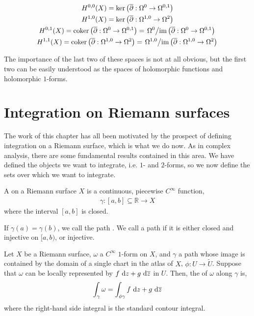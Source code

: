 \begin{gather*}
	H ^{0,0}(X) = \ker \left( \overline{\partial}: \Omega^0 \to \Omega ^{0,1} \right)\\
	H ^{1,0}(X) = \ker \left( \overline{\partial}: \Omega ^{1,0} \to \Omega^2 \right)\\
	H ^{0,1}(X) = \operatorname{coker} \left( \overline{\partial}: \Omega^0 \to \Omega ^{0,1}
	\right) = \left. \Omega^{0}\middle/\operatorname{im} \left( \overline{\partial
	}:\Omega^{0}\to \Omega^{0,1} \right) \right.\\
	H ^{1,1}(X) = \operatorname{coker} \left( \overline{\partial}: \Omega ^{1,0} \to \Omega^2
	\right) = \left. \Omega^{1,0}\middle/\operatorname{im} \left( \overline{\partial }:
	\Omega^{1,0}\to \Omega^{2} \right) \right.
\end{gather*}

The importance of the last two of these spaces is not at all obvious, but the
first two can be easily understood as the spaces of holomorphic functions and
holomorphic $ 1 $-forms.

\section{Integration on Riemann surfaces}
The work of this chapter has all been motivated by the prospect of defining
integration on a Riemann surface, which is what we do now. As in complex
analysis, there are some fundamental results contained in this area. We have
defined the objects we want to integrate, i.e. $ 1 $- and $ 2 $-forms, so we now
define the sets over which we want
to integrate.

\begin{definition}[Path]
	A  on a Riemann surface $ X $ is a continuous, piecewise $ C
			^{\infty} $ function,
	\begin{align*}
		\gamma:[a,b]\subseteq \mathbb{R} \to X
	\end{align*}
	where the interval $ [a,b] $ is closed.
\end{definition}

\begin{remark}
	If $ \gamma(a)=\gamma(b) $, we call the path . We call a path
	 if it is either closed and injective on $ [ a,b ) $, or
	injective.
\end{remark}

\begin{definition}
	Let $ X $ be a Riemann surface, $ \omega $ a $ C ^{\infty} $ $ 1 $-form on $ X
	$, and $ \gamma $ a path whose image is contained by the domain of a single
	chart in the atlas of $ X $, $ \phi:U \to \tilde{U} $. Suppose that $ \omega $
	can be locally represented by $ f \operatorname{\, d\!}{z} + g \operatorname{\, d\!}{\overline{z}} $ in $ U $. Then,
	the  of $ \omega $ along $ \gamma $ is,
	\begin{align*}
		\int_{\gamma}^{}{\omega} = \int_{\phi \gamma}^{}{f \operatorname{\, d\!}{z} + g
		\operatorname{\, d\!}{\overline{z}}}
	\end{align*}
	where the right-hand side integral is the standard contour integral.
\end{definition}

